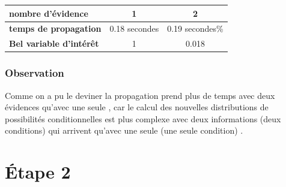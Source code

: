 \documentclass[12pt,a4paper,oneside]{book}
\begin{document}
		\begin{center}
			\begin{tabular}{ | l || c | c | }
				\hline
				\textbf{nombre d'évidence} & 1 &  2\\
				\hline
				\textbf{temps de propagation} & 0.18 secondes & 0.19 secondes\% \\
				\hline
				\textbf{Bel variable d'intérêt} & 1 & 0.018 \\
				\hline
			\end{tabular}
		\end{center}

		
	\subsubsection{Observation}
    	Comme on a pu le deviner la propagation prend plus de temps avec deux évidences qu'avec une seule , car le calcul des nouvelles distributions de possibilités conditionnelles est plus complexe avec deux informations (deux conditions) qui arrivent qu'avec une seule (une seule condition) .
	
	\section{Étape 2}
\end{document}
